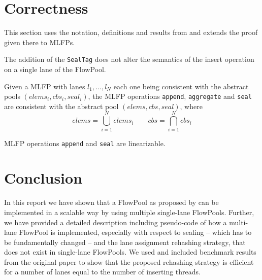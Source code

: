 \documentclass[runningheads,a4paper,fleqn]{llncs}
\begin{document}
\section{Correctness}
This section uses the notation, definitions and results from
\cite{FP12} and extends the proof given there to MLFPs.

\begin{lemma}[SealTag]
  The addition of the \verb+SealTag+ does not alter the semantics of
  the insert operation on a single lane of the FlowPool.
\end{lemma}

\begin{theorem}[Safety]
  Given a MLFP with lanes $l_1, \ldots, l_N$ each one being consistent
  with the abstract pools $(elems_i, cbs_i, seal_i)$, the MLFP
  operations \verb+append+, \verb+aggregate+ and \verb+seal+ are 
  consistent with the abstract pool $(elems, cbs, seal)$, where
  \[ elems = \bigcup_{i=1}^N elems_i \qquad
     cbs = \bigcap_{i=1}^N cbs_i \]
\end{theorem}

\begin{theorem}[Linearizability]
  MLFP operations \verb+append+ and \verb+seal+ are linearizable.
\end{theorem}

\section{Conclusion}
In this report we have shown that a FlowPool as proposed by
\cite{FP12} can be implemented in a scalable way by using multiple
single-lane FlowPools. Further, we have provided a detailed
description including pseudo-code of how a multi-lane FlowPool is
implemented, especially with respect to sealing -- which has to be
fundamentally changed -- and the lane assignment rehashing strategy,
that does not exist in single-lane FlowPools. We used and included
benchmark results from the original paper to show that the proposed
rehashing strategy is efficient for a number of lanes equal to the
number of inserting threads.



\end{document}
